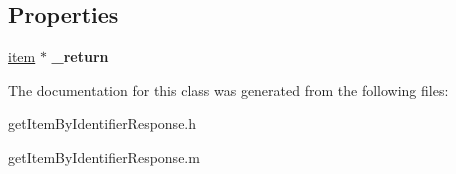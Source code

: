 \subsection*{Properties}
\begin{DoxyCompactItemize}
\item 
\hypertarget{interfaceget_item_by_identifier_response_acc805dca9118c5d575c4b0cdff3729ff}{}\hyperlink{interfaceitem}{item} $\ast$ {\bfseries \+\_\+return}\label{interfaceget_item_by_identifier_response_acc805dca9118c5d575c4b0cdff3729ff}

\end{DoxyCompactItemize}


The documentation for this class was generated from the following files\+:\begin{DoxyCompactItemize}
\item 
get\+Item\+By\+Identifier\+Response.\+h\item 
get\+Item\+By\+Identifier\+Response.\+m\end{DoxyCompactItemize}
